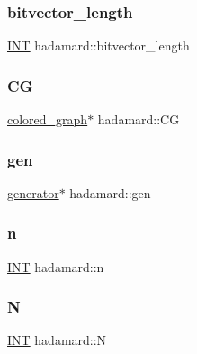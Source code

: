 \subsubsection{\texorpdfstring{bitvector\+\_\+length}{bitvector\_length}}
{\footnotesize\ttfamily \mbox{\hyperlink{galois_8h_a09fddde158a3a20bd2dcadb609de11dc}{I\+NT}} hadamard\+::bitvector\+\_\+length}

\mbox{\label{classhadamard_ae6ebddfda23ce9e874ab97480844aff1}} 
\subsubsection{\texorpdfstring{CG}{CG}}
{\footnotesize\ttfamily \mbox{\hyperlink{classcolored__graph}{colored\+\_\+graph}}$\ast$ hadamard\+::\+CG}

\mbox{\label{classhadamard_aec73f1c3f54480fbeb3392a034584046}} 
\subsubsection{\texorpdfstring{gen}{gen}}
{\footnotesize\ttfamily \mbox{\hyperlink{classgenerator}{generator}}$\ast$ hadamard\+::gen}

\mbox{\label{classhadamard_aaa7087a44d86f99804f4a42581f2a842}} 
\subsubsection{\texorpdfstring{n}{n}}
{\footnotesize\ttfamily \mbox{\hyperlink{galois_8h_a09fddde158a3a20bd2dcadb609de11dc}{I\+NT}} hadamard\+::n}

\mbox{\label{classhadamard_ae5ee601c2dbe8b01970b84422ad3a7ee}} 
\subsubsection{\texorpdfstring{N}{N}}
{\footnotesize\ttfamily \mbox{\hyperlink{galois_8h_a09fddde158a3a20bd2dcadb609de11dc}{I\+NT}} hadamard\+::N}

\mbox{\label{classhadamard_aac7ff83b713dacd1dbbb69a59ed99454}} 
